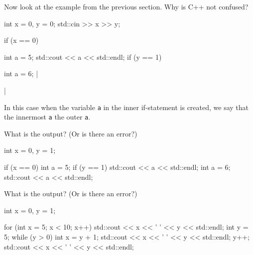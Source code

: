 \begin{ex} Now look at the example from the previous section. Why is C++ not confused?
\sidenote
{
}
\begin{consolethree}[escapeinside=||]
int x = 0, y = 0;
std::cin >> x >> y;

if (x == 0)
{    
     int a = 5;
     std::cout << a << std::endl;
     if (y == 1)
     {    
          int a = 6;
          ||
     }
}
\end{consolethree}
\end{ex}
In this case when the variable \texttt{a} in the inner if-statement is created, we say that the innermost \texttt{a}  the outer \texttt{a}.

\begin{ex}
What is the output? (Or is there an error?)

\begin{console}
int x = 0, y = 1;

if (x == 0)
{    
     int a = 5;
     if (y == 1)
     {    
          std::cout << a << std::endl;
          int a = 6;
          std::cout << a << std::endl;
     }
}
\end{console}
\end{ex}

\begin{ex}
What is the output? (Or is there an error?)

\begin{console}
int x = 0, y = 1;

for (int x = 5; x < 10; x++)
{    
     std::cout << x << ' ' << y << std::endl;
     int y = 5;
     while (y > 0)
     {   
          int x = y + 1;
          std::cout << x << ' ' << y << std::endl;
          y++;
     }  
     std::cout << x << ' ' << y << std::endl;
}
\end{console}
\end{ex}

